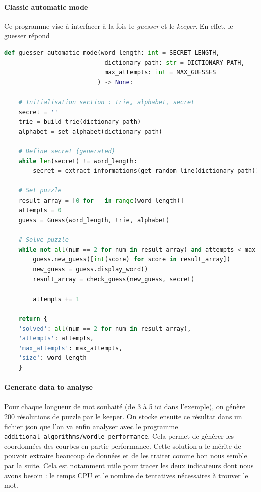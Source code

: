 \documentclass[10pt,a4paper,hidelinks]{article}
\begin{document}
\paragraph{Classic automatic mode}
Ce programme vise à interfacer à la fois le \textit{guesser} et le \textit{keeper}. En effet, le guesser répond 
\begin{lstlisting}[language=Python]
def guesser_automatic_mode(word_length: int = SECRET_LENGTH,
                            dictionary_path: str = DICTIONARY_PATH,
                            max_attempts: int = MAX_GUESSES
                          ) -> None:

    # Initialisation section : trie, alphabet, secret
    secret = ''
    trie = build_trie(dictionary_path)
    alphabet = set_alphabet(dictionary_path)

    # Define secret (generated)
    while len(secret) != word_length:
        secret = extract_informations(get_random_line(dictionary_path))

    # Set puzzle
    result_array = [0 for _ in range(word_length)]
    attempts = 0
    guess = Guess(word_length, trie, alphabet)

    # Solve puzzle
    while not all(num == 2 for num in result_array) and attempts < max_attempts:
        guess.new_guess([int(score) for score in result_array])
        new_guess = guess.display_word()
        result_array = check_guess(new_guess, secret)

        attempts += 1

    return {
    'solved': all(num == 2 for num in result_array),
    'attempts': attempts,
    'max_attempts': max_attempts,
    'size': word_length
    }

\end{lstlisting}

\paragraph{Generate data to analyse}
Pour chaque longueur de mot souhaité (de 3 à 5 ici dans l'exemple), on génère 200 résolutions de puzzle par le keeper. On stocke ensuite ce résultat dans un fichier json que l'on va enfin analyser avec le programme \verb|additional_algorithms/wordle_performance|. Cela permet de générer les coordonnées des courbes en partie performance. 
Cette solution a le mérite de pouvoir extraire beaucoup de données et de les traiter comme bon nous semble par la suite. Cela est notamment utile pour tracer les deux indicateurs dont nous avons besoin : le temps CPU et le nombre de tentatives nécessaires à trouver le mot.
\end{document}
